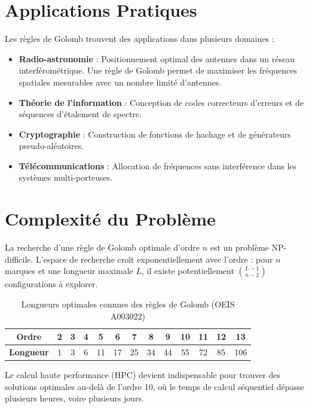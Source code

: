 \documentclass[12pt,a4paper,twoside]{report}
\begin{document}
\section{Applications Pratiques}

Les règles de Golomb trouvent des applications dans plusieurs domaines :

\begin{itemize}[leftmargin=*]
    \item \textbf{Radio-astronomie} : Positionnement optimal des antennes dans un réseau interférométrique. Une règle de Golomb permet de maximiser les fréquences spatiales mesurables avec un nombre limité d'antennes.

    \item \textbf{Théorie de l'information} : Conception de codes correcteurs d'erreurs et de séquences d'étalement de spectre.

    \item \textbf{Cryptographie} : Construction de fonctions de hachage et de générateurs pseudo-aléatoires.

    \item \textbf{Télécommunications} : Allocation de fréquences sans interférence dans les systèmes multi-porteuses.
\end{itemize}

\section{Complexité du Problème}

La recherche d'une règle de Golomb optimale d'ordre $n$ est un problème NP-difficile. L'espace de recherche croît exponentiellement avec l'ordre : pour $n$ marques et une longueur maximale $L$, il existe potentiellement $\binom{L-1}{n-2}$ configurations à explorer.

\begin{table}[htbp]
\centering
\caption{Longueurs optimales connues des règles de Golomb (OEIS A003022)}
\label{tab:optimal-lengths}
\begin{tabular}{@{}ccccccccccccc@{}}
\toprule
\textbf{Ordre} & 2 & 3 & 4 & 5 & 6 & 7 & 8 & 9 & 10 & 11 & 12 & 13 \\
\midrule
\textbf{Longueur} & 1 & 3 & 6 & 11 & 17 & 25 & 34 & 44 & 55 & 72 & 85 & 106 \\
\bottomrule
\end{tabular}
\end{table}

Le calcul haute performance (HPC) devient indispensable pour trouver des solutions optimales au-delà de l'ordre 10, où le temps de calcul séquentiel dépasse plusieurs heures, voire plusieurs jours.
\end{document}
